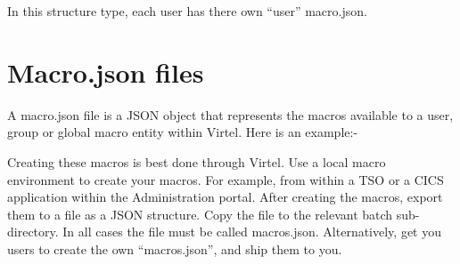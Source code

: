 \documentclass[letterpaper,10pt,english]{sphinxmanual}
\begin{document}
In this structure type, each user has there own “user” macro.json.


\section{Macro.json files}
\label{\detokenize{TN201903:macro-json-files}}
A macro.json file is a JSON object that represents the macros available to a user, group or global macro entity within Virtel. Here is an example:-

\begin{sphinxVerbatim}[commandchars=\\\{\}]
\PYG{p}{[}\PYG{p}{[}\PYG{p}{]}\PYG{p}{]}
\end{sphinxVerbatim}

Creating these macros is best done through Virtel. Use a local macro environment to create your macros. For example, from within a TSO or a CICS application within the Administration portal. After creating the macros, export them to a file as a JSON structure. Copy the file to the relevant batch sub-directory. In all cases the file must be called macros.json. Alternatively, get you users to create the own “macros.json”, and ship them to you.
\end{document}
